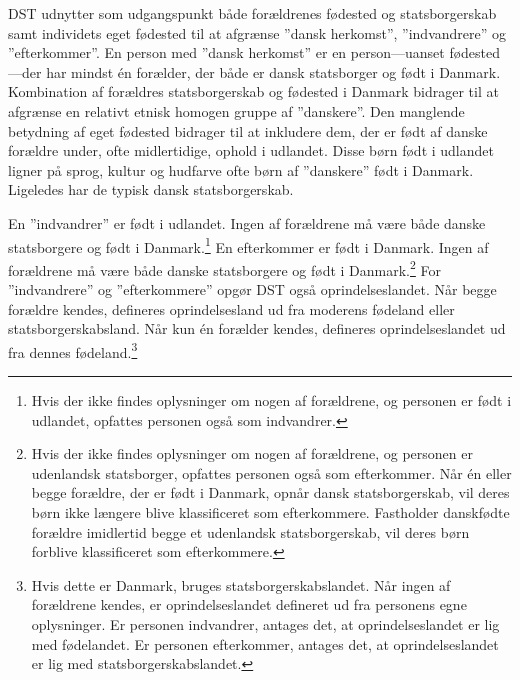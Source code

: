 \documentclass[
]{book}
\begin{document}
DST udnytter som udgangspunkt både forældrenes fødested og statsborgerskab samt individets eget fødested til at afgrænse ''dansk herkomst'', ''indvandrere'' og ''efterkommer''. En person med ''dansk herkomst'' er en person---uanset fødested---der har mindst én forælder, der både er dansk statsborger og født i Danmark. Kombination af forældres statsborgerskab og fødested i Danmark bidrager til at afgrænse en relativt etnisk homogen gruppe af ''danskere''. Den manglende betydning af eget fødested bidrager til at inkludere dem, der er født af danske forældre under, ofte midlertidige, ophold i udlandet. Disse børn født i udlandet ligner på sprog, kultur og hudfarve ofte børn af ''danskere'' født i Danmark. Ligeledes har de typisk dansk statsborgerskab.

En ''indvandrer'' er født i udlandet. Ingen af forældrene må være både danske statsborgere og født i Danmark.\footnote{Hvis der ikke findes oplysninger om nogen af forældrene, og personen er født i udlandet, opfattes personen også som indvandrer.} En efterkommer er født i Danmark. Ingen af forældrene må være både danske statsborgere og født i Danmark.\footnote{Hvis der ikke findes oplysninger om nogen af forældrene, og personen er udenlandsk statsborger, opfattes personen også som efterkommer. Når én eller begge forældre, der er født i Danmark, opnår dansk statsborgerskab, vil deres børn ikke længere blive klassificeret som efterkommere. Fastholder danskfødte forældre imidlertid begge et udenlandsk statsborgerskab, vil deres børn forblive klassificeret som efterkommere.} For ''indvandrere'' og ''efterkommere'' opgør DST også oprindelseslandet. Når begge forældre kendes, defineres oprindelsesland ud fra moderens fødeland eller statsborgerskabsland. Når kun én forælder kendes, defineres oprindelseslandet ud fra dennes fødeland.\footnote{Hvis dette er Danmark, bruges statsborgerskabslandet. Når ingen af forældrene kendes, er oprindelseslandet defineret ud fra personens egne oplysninger. Er personen indvandrer, antages det, at oprindelseslandet er lig med fødelandet. Er personen efterkommer, antages det, at oprindelseslandet er lig med statsborgerskabslandet.}
\end{document}
